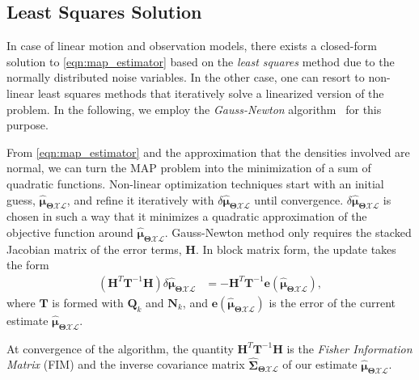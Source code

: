 \subsection{Least Squares Solution}

In case of linear motion and observation models, there exists a closed-form
solution to \eqref{eqn:map_estimator} based on the \emph{least squares} method
due to the normally distributed noise variables. In the other case, one can
resort to non-linear least squares methods that iteratively solve a linearized
version of the problem. In the following, we employ the \emph{Gauss-Newton}
algorithm~\cite{aster11parameter} for this purpose.

From \eqref{eqn:map_estimator} and the approximation that the densities involved
are normal, we can turn the MAP problem into the minimization of a sum of
quadratic functions. Non-linear optimization techniques start with an initial
guess,
$\hat{\boldsymbol{\mu}}_{\boldsymbol{\Theta}\mathcal{X}\mathcal{L}}$, and refine
it iteratively with
$\delta\hat{\boldsymbol{\mu}}_{\boldsymbol{\Theta}\mathcal{X}\mathcal{L}}$ until
convergence.
$\delta\hat{\boldsymbol{\mu}}_{\boldsymbol{\Theta}\mathcal{X}\mathcal{L}}$ is
chosen in such a way that it minimizes a quadratic approximation of the
objective function around
$\hat{\boldsymbol{\mu}}_{\boldsymbol{\Theta}\mathcal{X}\mathcal{L}}$.
Gauss-Newton method only requires the stacked Jacobian matrix of the error
terms, $\mathbf{H}$. In block
matrix form, the update takes the form
\begin{equation}\label{eqn:dx_update}
  \begin{aligned}
  (\mathbf{H}^T\mathbf{T}^{-1}\mathbf{H})
    \delta\hat{\boldsymbol{\mu}}_{\boldsymbol{\Theta}\mathcal{X}\mathcal{L}} &=
    -\mathbf{H}^T\mathbf{T}^{-1}\mathbf{e}(\mathbf{\hat{\boldsymbol{\mu}}_{
    \boldsymbol{\Theta}\mathcal{X}\mathcal{L}}}),
  \end{aligned}
\end{equation}
where $\mathbf{T}$ is formed with $\mathbf{Q}_k$ and $\mathbf{N}_k$, and
$\mathbf{e}(\mathbf{\hat{\boldsymbol{\mu}}_{
\boldsymbol{\Theta}\mathcal{X}\mathcal{L}}})$ is the error of the current
estimate $\hat{\boldsymbol{\mu}}_{\boldsymbol{\Theta}\mathcal{X}\mathcal{L}}$.

At convergence of the algorithm, the quantity
$\mathbf{H}^T\mathbf{T}^{-1}\mathbf{H}$ is the \emph{Fisher Information Matrix}
(FIM) and the inverse covariance matrix
$\hat{\boldsymbol{\Sigma}}_{\boldsymbol{\Theta}\mathcal{X}\mathcal{L}}$ of
our estimate
$\hat{\boldsymbol{\mu}}_{\boldsymbol{\Theta}\mathcal{X}\mathcal{L}}$.

